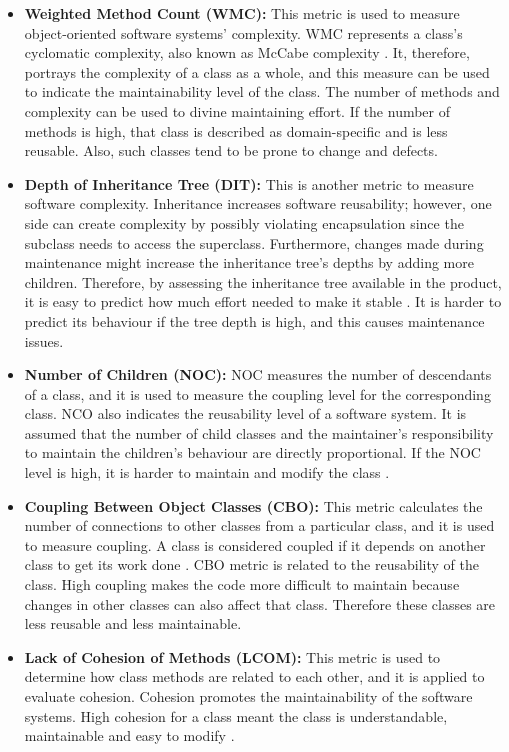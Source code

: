 \begin{itemize}
    \item \textbf{Weighted Method Count (WMC):} This metric is used to measure object-oriented software systems’ complexity. WMC represents a class's cyclomatic complexity, also known as McCabe complexity \cite{35}. It, therefore, portrays the complexity of a class as a whole, and this measure can be used to indicate the maintainability level of the class. The number of methods and complexity can be used to divine maintaining effort. If the number of methods is high, that class is described as domain-specific and is less reusable. Also, such classes tend to be prone to change and defects.
    \item \textbf{Depth of Inheritance Tree (DIT):} This is another metric to measure software complexity. Inheritance increases software reusability; however, one side can create complexity by possibly violating encapsulation since the subclass needs to access the superclass. Furthermore, changes made during maintenance might increase the inheritance tree's depths by adding more children. Therefore, by assessing the inheritance tree available in the product, it is easy to predict how much effort needed to make it stable \cite{33}. It is harder to predict its behaviour if the tree depth is high, and this causes maintenance issues.
    \item \textbf{Number of Children (NOC):} NOC measures the number of descendants of a class, and it is used to measure the coupling level for the corresponding class. NCO also indicates the reusability level of a software system. It is assumed that the number of child classes and the maintainer's responsibility to maintain the children's behaviour are directly proportional. If the NOC level is high, it is harder to maintain and modify the class \cite{36}.
    \item \textbf{Coupling Between Object Classes (CBO):} This metric calculates the number of connections to other classes from a particular class, and it is used to measure coupling. A class is considered coupled if it depends on another class to get its work done \cite{34}. CBO metric is related to the reusability of the class. High coupling makes the code more difficult to maintain because changes in other classes can also affect that class. Therefore these classes are less reusable and less maintainable.
    \item \textbf{Lack of Cohesion of Methods (LCOM):} This metric is used to determine how class methods are related to each other, and it is applied to evaluate cohesion. Cohesion promotes the maintainability of the software systems. High cohesion for a class meant the class is understandable, maintainable and easy to modify \cite{33}.
\end{itemize}

